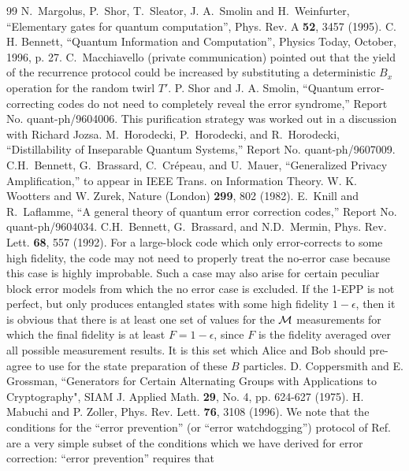 \begin{thebibliography}{99}
N.~Margolus, P.~Shor, T.~Sleator, J. A.~Smolin and H.~Weinfurter,
``Elementary gates for quantum computation'', Phys. Rev. A {\bf 52},
3457 (1995).
 C. H. Bennett, ``Quantum Information and Computation'',
Physics Today, October, 1996, p. 27.
  C.~Macchiavello (private communication) pointed
out that the yield of the recurrence protocol could be increased by
substituting a deterministic $B_x$ operation for the random twirl $T'$.
 P. Shor and J. A. Smolin, ``Quantum
error-correcting codes do not need to completely reveal the error
syndrome,'' Report No. quant-ph/9604006.
 This purification
strategy was worked out in a discussion with Richard Jozsa.
 M.~Horodecki, P.~Horodecki, and R.~Horodecki,
``Distillability of Inseparable Quantum Systems,'' Report No.
quant-ph/9607009.
 C.H.~Bennett, G.~Brassard, C.~Cr\'epeau, and
U.~Mauer, ``Generalized Privacy Amplification,'' to appear in IEEE
Trans. on Information Theory.
 W. K. Wootters and W. Zurek, Nature (London) {\bf 299}, 802
(1982).
E.~Knill and R.~Laflamme, ``A general theory 
of quantum error correction codes,'' Report No. quant-ph/9604034. 
C.H.~Bennett, G.~Brassard, and 
N.D.~Mermin, Phys. Rev. Lett. {\bf 68}, 557 (1992).
For a large-block code which
only error-corrects to some high fidelity, the code may not need
to properly treat the no-error case because this case is highly
improbable.  Such a case may also arise for certain peculiar block 
error models from which the no error case is excluded.  
If the 1-EPP is not perfect, but only produces entangled
states with some high fidelity $1-\epsilon$, then it is obvious that there
is at least one set of values for the $\cal M$ measurements for
which the final fidelity is at least $F=1-\epsilon$, since $F$ is
the fidelity averaged over all possible measurement results.  It is
this set which Alice and Bob should pre-agree to use for the state
preparation of these $B$ particles.
 D. Coppersmith and E. Grossman, ``Generators for Certain
Alternating Groups with Applications to Cryptography", SIAM J. Applied Math.
{\bf 29}, No. 4, pp. 624-627 (1975).
 H. Mabuchi and P. Zoller, Phys. Rev. Lett. {\bf 76}, 3108 (1996).
 We note that the conditions for the ``error prevention''
(or ``error watchdogging'') protocol of Ref.~\protect\cite{newest} are
a very simple subset of the conditions which we have derived for error
correction: ``error prevention'' requires that 

\end{thebibliography}
